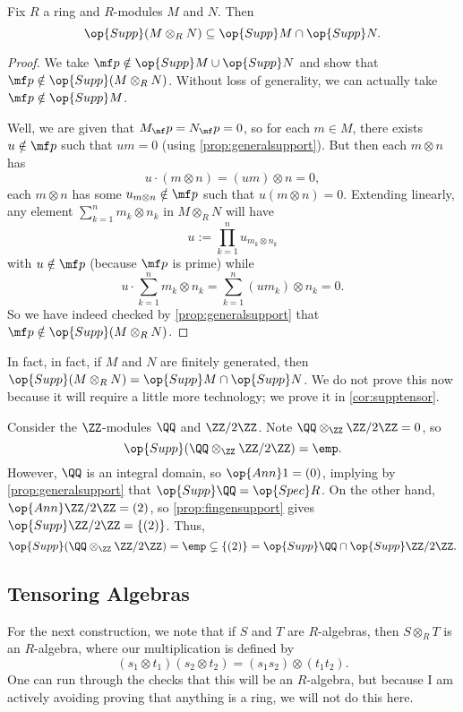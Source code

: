 \begin{proposition}
	Fix $R$ a ring and $R$-modules $M$ and $N$. Then
	\[\op{Supp}(M\otimes_RN)\subseteq\op{Supp}M\cap\op{Supp}N.\]
\end{proposition}
\begin{proof}
	We take $\mf p\notin\op{Supp}M\cup\op{Supp}N$ and show that $\mf p\notin\op{Supp}(M\otimes_RN)$. Without loss of generality, we can actually take $\mf p\notin\op{Supp}M$.

	Well, we are given that $M_\mf p=N_\mf p=0$, so for each $m\in M$, there exists $u\notin\mf p$ such that $um=0$ (using \autoref{prop:generalsupport}). But then each $m\otimes n$ has
	\[u\cdot(m\otimes n)=(um)\otimes n=0,\]
	each $m\otimes n$ has some $u_{m\otimes n}\notin\mf p$ such that $u(m\otimes n)=0$. Extending linearly, any element $\sum_{k=1}^nm_k\otimes n_k$ in $M\otimes_RN$ will have
	\[u:=\prod_{k=1}^nu_{m_k\otimes n_k}\]
	with $u\notin\mf p$ (because $\mf p$ is prime) while
	\[u\cdot\sum_{k=1}^nm_k\otimes n_k=\sum_{k=1}^n(um_k)\otimes n_k=0.\]
	So we have indeed checked by \autoref{prop:generalsupport} that $\mf p\notin\op{Supp}(M\otimes_RN)$.
\end{proof}
\begin{remark} \label{rem:supptensor}
	In fact, in fact, if $M$ and $N$ are finitely generated, then $\op{Supp}(M\otimes_RN)=\op{Supp}M\cap\op{Supp}N$. We do not prove this now because it will require a little more technology; we prove it in \autoref{cor:supptensor}.
\end{remark}
\begin{ex}
	Consider the $\ZZ$-modules $\QQ$ and $\ZZ/2\ZZ$. Note $\QQ\otimes_\ZZ\ZZ/2\ZZ=0$, so
	\[\op{Supp}(\QQ\otimes_\ZZ\ZZ/2\ZZ)=\emp.\]
	However, $\QQ$ is an integral domain, so $\op{Ann}1=(0)$, implying by \autoref{prop:generalsupport} that $\op{Supp}\QQ=\op{Spec}R$. On the other hand, $\op{Ann}\ZZ/2\ZZ=(2)$, so \autoref{prop:fingensupport} gives $\op{Supp}\ZZ/2\ZZ=\{(2)\}$. Thus,
	\[\op{Supp}(\QQ\otimes_\ZZ\ZZ/2\ZZ)=\emp\subsetneq\{(2)\}=\op{Supp}\QQ\cap\op{Supp}\ZZ/2\ZZ.\]
\end{ex}

\subsection{Tensoring Algebras}
For the next construction, we note that if $S$ and $T$ are $R$-algebras, then $S\otimes_RT$ is an $R$-algebra, where our multiplication is defined by
\[(s_1\otimes t_1)(s_2\otimes t_2)=(s_1s_2)\otimes(t_1t_2).\]
One can run through the checks that this will be an $R$-algebra, but because I am actively avoiding proving that anything is a ring, we will not do this here.

